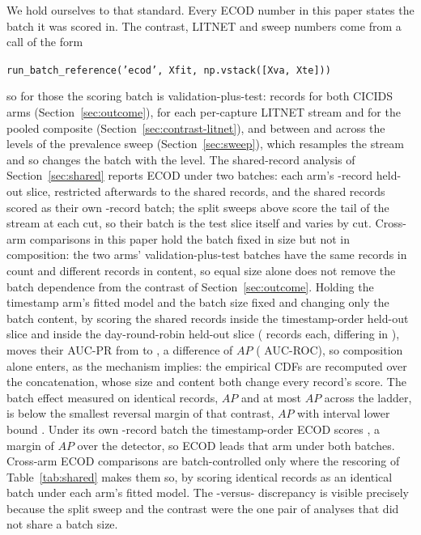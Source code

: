 \documentclass[manuscript,screen,nonacm]{acmart}
\begin{document}
We hold ourselves to that standard. Every ECOD number in this paper states the
batch it was scored in. The contrast, LITNET and sweep numbers come from a call
of the form

\begin{center}
\texttt{run\_batch\_reference('ecod',\,Xfit,\,np.vstack([Xva,\,Xte]))}
\end{center}

\noindent so for those the scoring batch is validation-plus-test:
\CicidsEcodScoringBatch{} records for both CICIDS arms
(Section~\ref{sec:outcome}), \LitnetCaptureEcodScoringBatch{} for each
per-capture LITNET stream and \LitnetPooledEcodScoringBatch{} for the pooled
composite (Section~\ref{sec:contrast-litnet}), and between
\SweepEcodScoringBatchMin{} and \SweepEcodScoringBatchMax{} across the levels
of the prevalence sweep (Section~\ref{sec:sweep}), which resamples the stream
and so changes the batch with the level. The shared-record analysis of
Section~\ref{sec:shared} reports ECOD under two batches: each arm's
\CicidsHeldoutSize-record held-out slice, restricted afterwards to the
\RevSharedRecords{} shared records, and the shared records scored as their own
\RevSharedRecords-record batch; the split sweeps above score the tail of the
stream at each cut, so their batch is the test slice itself and varies by cut.
Cross-arm comparisons in this paper hold the batch fixed in size but not in
composition: the two arms' validation-plus-test batches have the same
\CicidsEcodScoringBatch{} records in count and different records in content,
so equal size alone does not remove the batch dependence from the contrast of
Section~\ref{sec:outcome}. Holding the timestamp arm's fitted model and the
batch size fixed and changing only the batch content, by scoring the
\RefEcodCompSharedRecords{} shared records inside the timestamp-order held-out
slice and inside the day-round-robin held-out slice
(\RefEcodCompBatchRecords{} records each, differing in
\RefEcodCompDifferingRecords), moves their AUC-PR from
\RefEcodCompNaturalBatchAucpr{} to \RefEcodCompSyntheticBatchAucpr, a
difference of \RefEcodCompDeltaAucpr{} $AP$ (\RefEcodCompDeltaAucroc{}
AUC-ROC), so composition alone enters, as the mechanism implies: the empirical
CDFs are recomputed over the concatenation, whose size and content both change
every record's score. The batch effect measured on identical records,
\RevEcodBatchDelta{} $AP$ and at most \RevEcodBatchSpread{} $AP$ across the
ladder, is below the smallest reversal margin of that contrast,
\SFourCicidsNaturalEcodMinusDetectorAucpr{} $AP$ with interval lower bound
\RefBootFullNaturalMarginLo. Under its own \RevEcodBatchEvalRecords-record
batch the timestamp-order ECOD scores \RevEcodBatchTwoFourZeroZeroZeroZeroAucpr,
a margin of \SFourCicidsNaturalEcodOwnBatchMinusDetectorAucpr{} $AP$ over the
detector, so ECOD leads that arm under both batches. Cross-arm ECOD
comparisons are batch-controlled
only where the rescoring of Table~\ref{tab:shared} makes them so, by scoring
identical records as an identical batch under each arm's fitted model. The
\CicidsHeldoutSize-versus-\CicidsEcodScoringBatch{} discrepancy is visible
precisely because the split sweep and the contrast were the one pair of
analyses that did not share a batch size.
\end{document}
